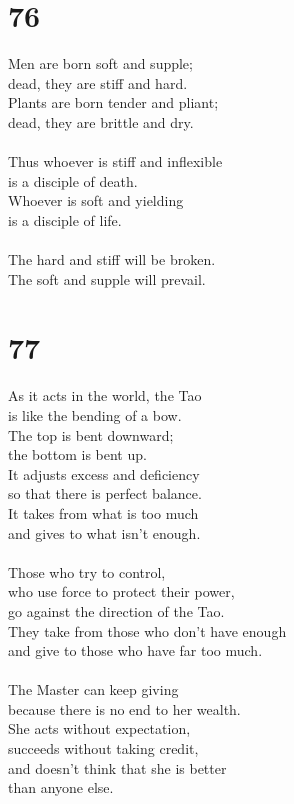 \documentclass[b5paper, 12pt, oneside]{book}
\begin{document}
\chapter*{76}
Men are born soft and supple;\\
dead, they are stiff and hard.\\
Plants are born tender and pliant;\\
dead, they are brittle and dry.\\
\\
Thus whoever is stiff and inflexible\\
is a disciple of death.\\
Whoever is soft and yielding\\
is a disciple of life.\\
\\
The hard and stiff will be broken.\\
The soft and supple will prevail.

\chapter*{77}
As it acts in the world, the Tao\\
is like the bending of a bow.\\
The top is bent downward;\\
the bottom is bent up.\\
It adjusts excess and deficiency\\
so that there is perfect balance.\\
It takes from what is too much\\
and gives to what isn't enough.\\
\\
Those who try to control,\\
who use force to protect their power,\\
go against the direction of the Tao.\\
They take from those who don't have enough\\
and give to those who have far too much.\\
\\
The Master can keep giving\\
because there is no end to her wealth.\\
She acts without expectation,\\
succeeds without taking credit,\\
and doesn't think that she is better\\
than anyone else.
\end{document}

